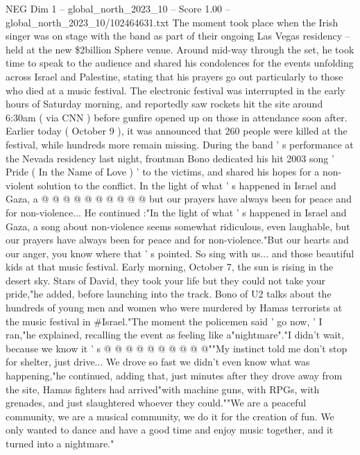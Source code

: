 \begin{textsample}{NEG Dim 1 – global\_north\_2023\_10 – Score 1.00 – global\_north\_2023\_10/102464631.txt}  \label{ex:f1_neg_136}
The moment took place when the Irish singer was on stage with the band as part of their ongoing Las Vegas residency -- held at the new \$2billion Sphere venue.
Around mid-way through the set, he took time to speak to the audience and shared his condolences for the events unfolding across Israel and Palestine, stating that his prayers go out particularly to those who died at a music festival.
The electronic festival was interrupted in the early hours of Saturday morning, and reportedly saw rockets hit the site around 6:30am ( via CNN ) before gunfire opened up on those in attendance soon after.
Earlier today ( October 9 ), it was announced that 260 people were killed at the festival, while hundreds more remain missing.
During the band ' s performance at the Nevada residency last night, frontman Bono dedicated his hit 2003 song ' Pride ( In the Name of Love ) ' to the victims, and shared his hopes for a non-violent solution to the conflict.
In the light of what ' s happened in Israel and Gaza, a @ @ @ @ @ @ @ @ @ @ but our prayers have always been for peace and for non-violence...
He continued :"In the light of what ' s happened in Israel and Gaza, a song about non-violence seems somewhat ridiculous, even laughable, but our prayers have always been for peace and for non-violence."But our hearts and our anger, you know where that ' s pointed.
So sing with us... and those beautiful kids at that music festival.
Early morning, October 7, the sun is rising in the desert sky.
Stars of David, they took your life but they could not take your pride,"he added, before launching into the track.
Bono of U2 talks about the hundreds of young men and women who were murdered by Hamas terrorists at the music festival in \#Israel."The moment the policemen said ' go now, ' I ran,"he explained, recalling the event as feeling like a"nightmare"."I didn't wait, because we know it ' s @ @ @ @ @ @ @ @ @ @""My instinct told me don't stop for shelter, just drive...
We drove so fast we didn't even know what was happening,"he continued, adding that, just minutes after they drove away from the site, Hamas fighters had arrived"with machine guns, with RPGs, with grenades, and just slaughtered whoever they could.""We are a peaceful community, we are a musical community, we do it for the creation of fun.
We only wanted to dance and have a good time and enjoy music together, and it turned into a nightmare."

\end{textsample}
